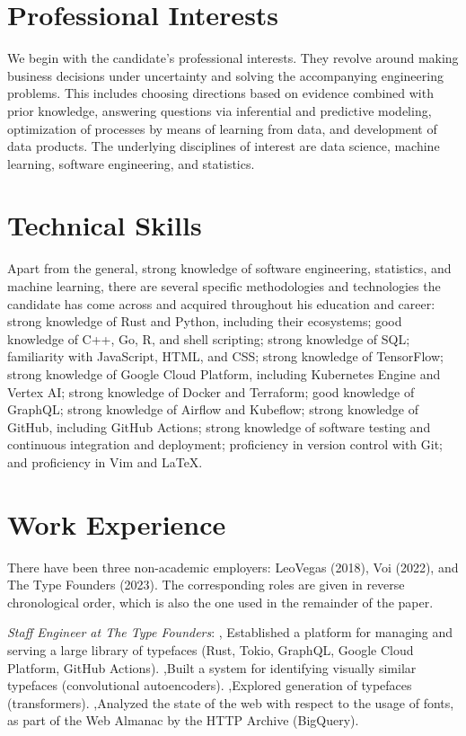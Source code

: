 \documentclass[journal]{IEEEtran}
\begin{document}
\section{Professional Interests} 

We begin with the candidate's professional interests. They revolve around making
business decisions under uncertainty and solving the accompanying engineering
problems. This includes choosing directions based on evidence combined with
prior knowledge, answering questions via inferential and predictive modeling,
optimization of processes by means of learning from data, and development of
data products. The underlying disciplines of interest are data science, machine
learning, software engineering, and statistics.

\section{Technical Skills} 

Apart from the general, strong knowledge of software engineering, statistics,
and machine learning, there are several specific methodologies and technologies
the candidate has come across and acquired throughout his education and career:
strong knowledge of Rust and Python, including their ecosystems; good knowledge
of C++, Go, R, and shell scripting; strong knowledge of SQL; familiarity with
JavaScript, HTML, and CSS; strong knowledge of TensorFlow; strong knowledge of
Google Cloud Platform, including Kubernetes Engine and Vertex AI; strong
knowledge of Docker and Terraform; good knowledge of GraphQL; strong knowledge
of Airflow and Kubeflow; strong knowledge of GitHub, including GitHub Actions;
strong knowledge of software testing and continuous integration and deployment;
proficiency in version control with Git; and proficiency in Vim and LaTeX.

\section{Work Experience} 

There have been three non-academic employers: LeoVegas (2018), Voi (2022), and
The Type Founders (2023). The corresponding roles are given in reverse
chronological order, which is also the one used in the remainder of the paper.

\date{February 2023--Present} \emph{Staff Engineer at The Type Founders}: \sep
Established a platform for managing and serving a large library of typefaces
(Rust, Tokio, GraphQL, Google Cloud Platform, GitHub Actions). \sep Built a
system for identifying visually similar typefaces (convolutional autoencoders).
\sep Explored generation of typefaces (transformers). \sep Analyzed the state of
the web with respect to the usage of fonts, as part of the Web Almanac by the
HTTP Archive (BigQuery).
\end{document}
